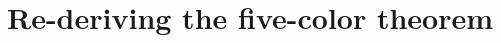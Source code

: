 \documentclass{article}
\begin{document}
\title{Re-deriving the five-color theorem}
\maketitle



\appendix

\end{document}
